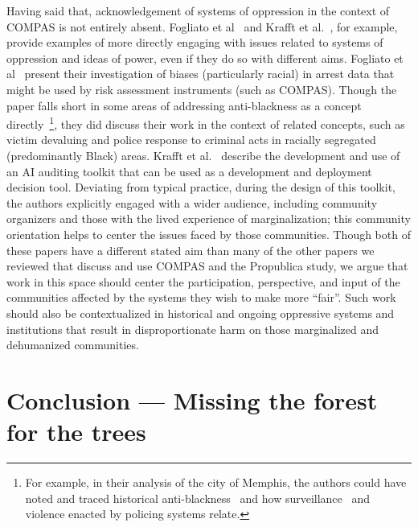 \documentclass[manuscript]{acmart}
\begin{document}
Having said that, acknowledgement of systems of oppression in the context of COMPAS is not entirely absent. Fogliato et al~\cite{fogliato21compas} and Krafft et al.~\cite{krafft21compas}, for example, provide examples of more directly engaging with issues related to systems of oppression and ideas of power, even if they do so with different aims. Fogliato et al~\cite{fogliato21compas} present their investigation of biases (particularly racial) in arrest data that might be used by risk assessment instruments (such as COMPAS). Though the paper falls short in some areas of addressing anti-blackness as a concept directly~\footnote{For example, in their analysis of the city of Memphis, the authors could have noted and traced historical anti-blackness~\cite{wells1893lynch} and how surveillance~\cite{jefferson2020digitizepunish} and violence enacted by policing systems relate.}, they did discuss their work in the context of related concepts, such as victim devaluing and police response to criminal acts in racially segregated (predominantly Black) areas. Krafft et al.~\cite{krafft21compas} describe the development and use of an AI auditing toolkit that can be used as a development and deployment decision tool. Deviating from typical practice, during the design of this toolkit, the authors explicitly engaged with a wider audience, including community organizers and those with the lived experience of marginalization; this community orientation  helps to center the issues faced by those communities. Though both of these papers have a different stated aim than many of the other papers we reviewed that discuss and use COMPAS and the Propublica study, we %
argue that work in this space should %
center the participation, perspective, and input of the communities affected by the systems they wish to make more ``fair''. Such work should also be contextualized in %
historical and ongoing oppressive systems and institutions that result in disproportionate harm on those marginalized and dehumanized communities.


\section{Conclusion --- Missing the forest for the trees}
\label{sect:conclusion}
\end{document}
